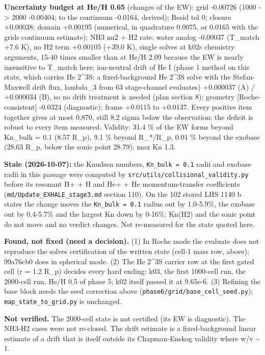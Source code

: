 \documentclass[english,a4paper]{my_memo}
\begin{document}
\textbf{Uncertainty budget at He/H 0.65} (changes of the EW):
grid -0.00726 (1000 -\textgreater{} 2000 -0.00404; to the continuum -0.0164, derived);
Resid tol 0; closure +0.00038; domain +0.00195 (numerical, in quadrature
0.0075, or 0.0165 with the grid\textquotesingle s continuum estimate); NH3 nu2 + H2 rate: water analog -0.00037 (T\_match +7.6
K), no H2 term +0.00105 (+39.0 K), single solves at k02\textquotesingle s chemistry
arguments, 15-40 times smaller than at He/H 2.09 because the EW is nearly
insensitive to T\_match here; ion-neutral drift of He I (phase 1 method on
this state, which carries He 2\^{}3S: a fixed-background He 2\^{}3S solve with the
Stefan-Maxwell drift flux, lambda\_3 from 63 stage-channel evaluates) +0.000037
(A) / +0.000034 (B), so no drift treatment is needed (plan section 8);
geometry {[}Roche-consistent{]} -0.0324 (diagnostic); frame +0.0115 to +0.0137.
Every positive item together gives at most 0.870, still 8.2 sigma below the
observation: the deficit is robust to every item measured. Validity: 31.4 \%
of the EW forms beyond Kn\_bulk = 0.1 (8.57 R\_p), 9.1 \% beyond R\_*/R\_p, 0.01 \%
beyond the exobase (28.63 R\_p, below the sonic point 28.79); max Kn 1.3.

\textbf{Stale (2026-10-07):} the Knudsen numbers, \texttt{Kn\_bulk\ =\ 0.1} radii and exobase radii in this passage were computed by \texttt{src/utils/collisional\_validity.py} before its resonant H+ + H and He+ + He momentum-transfer coefficients (\texttt{md/Update\_EXHALE\_stage3.md} section 110). On the 102 stored LHS 1140 b states the change moves the \texttt{Kn\_bulk\ =\ 0.1} radius out by 1.0-5.9\%, the exobase out by 0.4-5.7\% and the largest Kn down by 0-16\%; Kn(H2) and the sonic point do not move and no verdict changes. Not re-measured for the state quoted here.

\textbf{Found, not fixed (need a decision).} (1) In Roche mode the evaluate does
not reproduce the solve\textquotesingle s certification of the written state (cell-1 mass
row, above); 99a76cb0 does in spherical mode. (2) The He 2\^{}3S carrier row at
the first gated cell (r = 1.2 R\_p) decides every hard ending: k03, the first
1000-cell run, the 2000-cell run, He/H 0.5 of phase 5; k02 itself passed
it at 9.65e-6.
(3) Refining the base block needs the seed correction above
(\texttt{phase6/grid/base\_cell\_seed.py}); \texttt{map\_state\_to\_grid.py} is unchanged.

\textbf{Not verified.} The 2000-cell state is not certified (its EW is
diagnostic). The NH3-H2 cases were not re-closed. The drift estimate is a fixed-background linear estimate of a
drift that is itself outside its Chapman-Enskog validity where w/v \textasciitilde{} 1.
\end{document}
